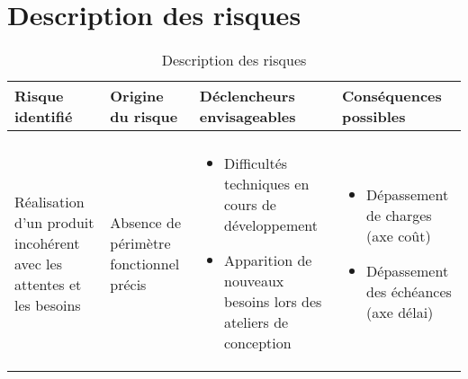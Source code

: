 \documentclass[12pt]{article}
\begin{document}
\section{Description des risques}
\begin{landscape}
\begin{table}[H]
\scriptsize
\caption{Description des risques}
\begin{tabular}{p{}p{3.5cm}p{6.75cm} p{6.75cm}}
\hline Risque identifié & \bf Origine du risque & \bf Déclencheurs envisageables & \bf Conséquences possibles \\
\hline
&&&\\
Réalisation d’un produit incohérent avec les attentes et les besoins & Absence de périmètre fonctionnel précis\cellcolor{blue!50} & 
 \begin{itemize}
\item Difficultés techniques en cours de développement
 			\item Apparition de nouveaux besoins lors des ateliers de conception
 			\cellcolor{green!50}
 \end{itemize} & 
 \begin{itemize}
 	\item Dépassement de charges (axe coût)
 	\item Dépassement des échéances (axe délai)
 \end{itemize}
 \cellcolor{red!50}\\


\hline
\end{tabular}
\end{table}
\end{landscape}

\end{document}
